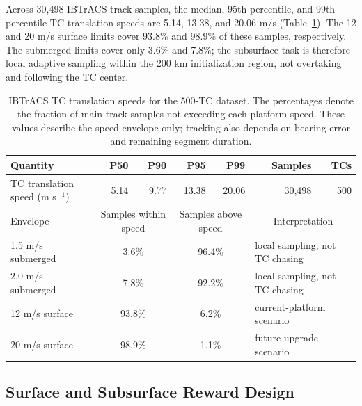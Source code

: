 \documentclass[a4paper,fleqn]{cas-dc}
\begin{document}
Across 30,498 IBTrACS track samples, the median, 95th-percentile, and
99th-percentile TC translation speeds are 5.14, 13.38, and 20.06 m/s
(Table~\ref{tab:tc_speed_envelope}). The 12 and 20 m/s surface limits cover
93.8\% and 98.9\% of these samples, respectively. The submerged limits cover
only 3.6\% and 7.8\%; the subsurface task is therefore local adaptive sampling
within the 200 km initialization region, not overtaking and following the TC
center.
\begin{table}[t]
\centering
\caption{IBTrACS TC translation speeds for the 500-TC dataset.
The percentages denote the fraction of main-track samples not exceeding
each platform speed. These values describe the speed envelope only;
tracking also depends on bearing error and remaining segment duration.}
\label{tab:tc_speed_envelope}
\small
\begin{tabular*}{\textwidth}{@{\extracolsep{\fill}}lrrrrrr@{}}
\toprule
Quantity & P50 & P90 & P95 & P99 & Samples & TCs \\
\midrule
TC translation speed (m s$^{-1}$) & 5.14 & 9.77 & 13.38 & 20.06 & 30,498 & 500 \\
\midrule
Envelope & \multicolumn{2}{c}{Samples within speed} & \multicolumn{2}{c}{Samples above speed} & \multicolumn{2}{c}{Interpretation} \\
1.5 m/s submerged & \multicolumn{2}{c}{3.6\%} & \multicolumn{2}{c}{96.4\%} & \multicolumn{2}{l}{local sampling, not TC chasing} \\
2.0 m/s submerged & \multicolumn{2}{c}{7.8\%} & \multicolumn{2}{c}{92.2\%} & \multicolumn{2}{l}{local sampling, not TC chasing} \\
12 m/s surface & \multicolumn{2}{c}{93.8\%} & \multicolumn{2}{c}{6.2\%} & \multicolumn{2}{l}{current-platform scenario} \\
20 m/s surface & \multicolumn{2}{c}{98.9\%} & \multicolumn{2}{c}{1.1\%} & \multicolumn{2}{l}{future-upgrade scenario} \\
\bottomrule
\end{tabular*}
\end{table}

\subsection{Surface and Subsurface Reward Design}
\end{document}
